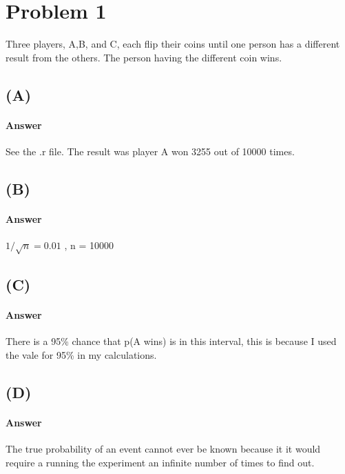 \documentclass[12pt]{article}
\begin{document}
\maketitle

\section*{Problem 1}
Three  players,  A,B,  and  C,  each  flip  their  coins  until  one  person  has  a different  result  from  the  others. The person having the different coin wins.

\subsection*{(A)}

\paragraph{Answer}
See the .r file. The result was player A won 3255 out of  10000 times.

\subsection*{(B)}

\paragraph{Answer}
$1/\sqrt{n} = 0.01$ , n = 10000

\subsection*{(C)}

\paragraph{Answer}
There is a 95\% chance that p(A wins) is in this interval, this is because I used the vale for 95\% in my calculations.

\subsection*{(D)}
 
 \paragraph{Answer}
 The true probability of an event cannot ever be known because it it would require a running the experiment an infinite number of times to find out.
\end{document}
